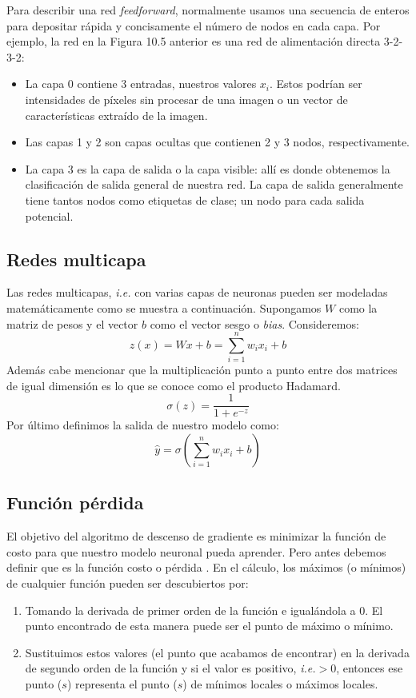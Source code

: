 \documentclass[14.5pt,a4paper]{article}
\begin{document}
Para describir una red \textit{feedforward}, normalmente usamos una secuencia de enteros para depositar rápida y concisamente el número de nodos en cada capa. Por ejemplo, la red en la Figura 10.5 anterior es una red de alimentación directa 3-2-3-2:

\begin{itemize}
\item La capa 0 contiene 3 entradas, nuestros valores $x_i$. Estos podrían ser intensidades de píxeles sin procesar de una imagen o un vector de características extraído de la imagen.
\item Las capas 1 y 2 son capas ocultas que contienen 2 y 3 nodos, respectivamente.
\item La capa 3 es la capa de salida o la capa visible: allí es donde obtenemos la clasificación de salida general de nuestra red. La capa de salida generalmente tiene tantos nodos como etiquetas de clase; un nodo para cada salida potencial.
\end{itemize}

\subsection{Redes multicapa}
Las redes multicapas, \textit{i.e.} con varias capas de neuronas pueden ser modeladas matemáticamente como se muestra a continuación.
Supongamos $W$ como la matriz de pesos y el vector $b$ como el vector sesgo o \textit{bias}.
Consideremos:
\begin{equation}
z(x)=Wx+b=\sum_{i=1}^{n}w_ix_i+b
\end{equation}
Además cabe mencionar que la multiplicación punto a punto entre dos matrices de igual dimensión es lo que se conoce como el producto Hadamard.
\begin{equation}
\sigma(z)=\frac{1}{1+e^{-z}}
\end{equation}
Por último definimos la salida de nuestro modelo como:
\begin{equation}
\hat{y}=\sigma(\sum_{i=1}^{n}w_ix_i+b)
\end{equation}

\subsection{Función pérdida}

El objetivo del algoritmo de descenso de gradiente es minimizar la función de costo para que nuestro modelo neuronal pueda aprender.
Pero antes debemos definir que es la función costo o pérdida \cite{sgd}.
En el cálculo, los máximos (o mínimos) de cualquier función pueden ser descubiertos por:
\begin{enumerate}
\item Tomando la derivada de primer orden de la función e igualándola a 0. El punto encontrado de esta manera puede ser el punto de máximo o mínimo.
\item Sustituimos estos valores (el punto que acabamos de encontrar) en la derivada de segundo orden de la función y si el valor es positivo, \textit{i.e.}$>0$, entonces ese punto ($s$) representa el punto ($s$) de mínimos locales o máximos locales.
\end{enumerate}
\end{document}
